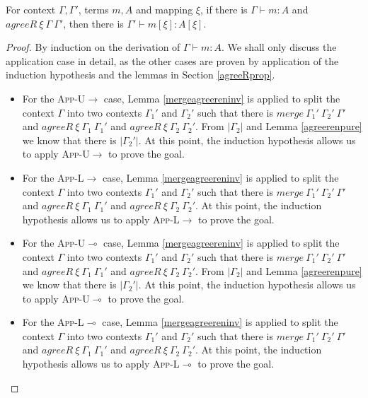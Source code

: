 \documentclass[sigplan,screen,review,anonymous]{acmart}
\newcommand{\rname}[1]{\textsc{\footnotesize #1}}
\newcommand{\pure}[1]{|#1|}
\newcommand{\mrg}[3]{merge\ {#1}\ {#2}\ {#3}}
\begin{document}
\begin{lemma}\label{renaming}
  For context $\Gamma, \Gamma'$, terms $m, A$ and mapping $\xi$, if there is $\Gamma \vdash m : A$ and $agreeR\ \xi\ \Gamma\ \Gamma'$, then there is $\Gamma' \vdash m[\xi] : A[\xi]$.
\end{lemma}
\begin{proof}
  By induction on the derivation of $\Gamma \vdash m : A$. We shall only discuss the application case in detail, as the other cases are proven by application of the induction hypothesis and the lemmas in Section \ref{agreeRprop}.
  \begin{itemize}
    \item For the \rname{App-U$\rightarrow$} case, Lemma \ref{mergeagreereninv} is applied to split the context $\Gamma$ into two contexts $\Gamma_1'$ and $\Gamma_2'$ such that there is $\mrg{\Gamma_1'}{\Gamma_2'}{\Gamma'}$ and $agreeR\ \xi\ \Gamma_1\ \Gamma_1'$ and $agreeR\ \xi\ \Gamma_2\ \Gamma_2'$. From $\pure{\Gamma_2}$ and Lemma \ref{agreerenpure} we know that there is $\pure{\Gamma_2'}$. At this point, the induction hypothesis allows us to apply \rname{App-U$\rightarrow$} to prove the goal.
    \item For the \rname{App-L$\rightarrow$} case, Lemma \ref{mergeagreereninv} is applied to split the context $\Gamma$ into two contexts $\Gamma_1'$ and $\Gamma_2'$ such that there is $\mrg{\Gamma_1'}{\Gamma_2'}{\Gamma'}$ and $agreeR\ \xi\ \Gamma_1\ \Gamma_1'$ and $agreeR\ \xi\ \Gamma_2\ \Gamma_2'$. At this point, the induction hypothesis allows us to apply \rname{App-L$\rightarrow$} to prove the goal.
    \item For the \rname{App-U$\multimap$} case, Lemma \ref{mergeagreereninv} is applied to split the context $\Gamma$ into two contexts $\Gamma_1'$ and $\Gamma_2'$ such that there is $\mrg{\Gamma_1'}{\Gamma_2'}{\Gamma'}$ and $agreeR\ \xi\ \Gamma_1\ \Gamma_1'$ and $agreeR\ \xi\ \Gamma_2\ \Gamma_2'$. From $\pure{\Gamma_2}$ and Lemma \ref{agreerenpure} we know that there is $\pure{\Gamma_2'}$. At this point, the induction hypothesis allows us to apply \rname{App-U$\multimap$} to prove the goal.
    \item For the \rname{App-L$\multimap$} case, Lemma \ref{mergeagreereninv} is applied to split the context $\Gamma$ into two contexts $\Gamma_1'$ and $\Gamma_2'$ such that there is $\mrg{\Gamma_1'}{\Gamma_2'}{\Gamma'}$ and $agreeR\ \xi\ \Gamma_1\ \Gamma_1'$ and $agreeR\ \xi\ \Gamma_2\ \Gamma_2'$. At this point, the induction hypothesis allows us to apply \rname{App-L$\multimap$} to prove the goal.
  \end{itemize}
\end{proof}
\end{document}

